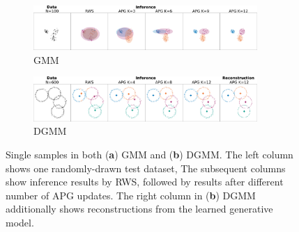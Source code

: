 \documentclass{article}
\theoremstyle{definition}
\begin{document}
\begin{figure}[t!]
  \centering
  \begin{subfigure}[t]{0.5\textwidth}
  \includegraphics[width=85mm]{figures/gmm_samples.pdf}
  \vspace*{-1mm}
  \caption{GMM}
  \label{fig:samples-gmm}
  \vspace{-1ex}
  \end{subfigure}%
  \begin{subfigure}[t]{0.5\textwidth}
  \includegraphics[width=85mm]{figures/dgmm_samples.pdf}
  \vspace*{-1mm}
  \caption{DGMM}
  \label{fig:samples-dgmm}
  \vspace{-1ex}
  \end{subfigure}
  \caption{Single samples in both (\textbf{a}) GMM and (\textbf{b}) DGMM. The left column shows one randomly-drawn test dataset, The subsequent columns show inference results by RWS, followed by results after different number of APG updates. The right column in (\textbf{b}) DGMM additionally shows reconstructions from the learned generative model.}
  \label{fig:samples-mixture}
\end{figure}
\end{document}
